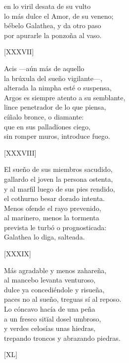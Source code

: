 \documentclass[11pt,a4paper,twoside]{article}
\begin{document}
en lo viril desata de su vulto\\
lo más dulce el Amor, de su veneno;\\
bébelo Galathea, y da otro paso\\
por apurarle la ponzoña al vaso.\pend
\begin{center}
	[XXXVII]
\end{center}\pstart
Acis —aún más de aquello \\
la brúxula del sueño vigilante—,\\
alterada la nimpha esté o suspensa,\\
Argos es siempre atento a su semblante,\\
lince penetrador de lo que piensa,\\
cíñalo bronce, o  diamante:\\
que en sus palladïones  ciego,\\
sin romper muros, introduce fuego.\pend 
\begin{center}
	[XXXVIII]
\end{center}\pstart
El sueño de sus miembros sacudido,\\
gallardo el joven la persona ostenta,\\
y al marfil luego de sus pies rendido,\\
el cothurno besar dorado intenta.\\
Menos ofende el rayo prevenido,\\
al marinero, menos la tormenta\\
prevista le turbó o prognosticada:\\
Galathea lo diga, salteada.\pend 
\begin{center}
	[XXXIX]
\end{center}\pstart
Más agradable y menos zahareña,\\
al mancebo levanta venturoso,\\
dulce ya concediéndole y risueña,\\
paces no al sueño, treguas sí al reposo.\\
Lo cóncavo hacía de una peña\\
a un fresco sitïal dosel umbroso,\\
y verdes celosías unas hiedras,\\
trepando troncos y abrazando piedras.\pend
\begin{center}
	[XL]
\end{center}\pstart
\end{document}
